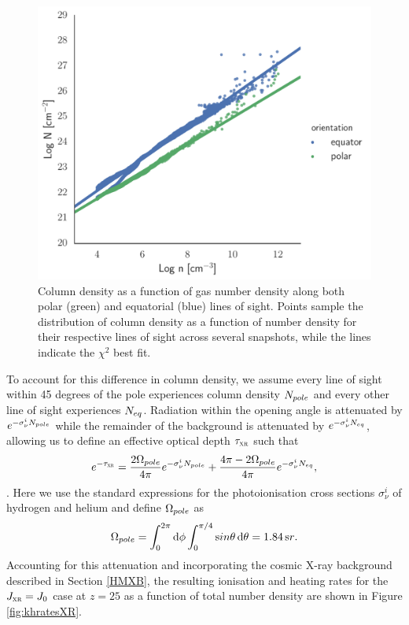 \documentclass[../thesis.tex]{subfiles}
\begin{document}
\begin{figure}
\begin{center}
\includegraphics[width=\columnwidth]{figures/optical_depth/col_density_fit}
\caption{\label{fig:ncol_fit}
Column density as a function of gas number density along both polar (green) and equatorial (blue) lines of sight.  Points sample the distribution of column density as a function of number density for their respective lines of sight across several snapshots, while the lines indicate the $\chi^2$ best fit.}
\end{center}
\end{figure}

To account for this difference in column density, we assume every line of sight within 45 degrees of the pole \citep{Hosokawaetal2011} experiences column density $N_{\mathrm \small pole}$ and every other line of sight experiences $N_{\mathrm \small eq}$. Radiation within the opening angle is attenuated by $e^{-\sigma_{\nu}^i N_{\mathrm \small pole}}$ while the remainder of the background is attenuated by $e^{-\sigma_{\nu}^i N_{\mathrm \small eq}}$, allowing us to define an effective optical depth $\tau_{\textsc{xr}}$ such that
\begin{equation}
e^{-\tau_{\textsc{xr}}} = \frac{2 \Omega_{\mathrm \small pole}}{4\pi} e^{-\sigma_{\nu}^i N_{\mathrm \small pole}} + \frac{4\pi - 2 \Omega_{\mathrm \small pole}}{4\pi} e^{-\sigma_{\nu}^i N_{\mathrm \small eq}},
\end{equation}
\citep[e.g.,][]{ClarkGlover2014}.
Here we use the standard expressions for the photoionisation cross sections $\sigma^i_{\nu}$ of hydrogen and helium \citep[e.g.,][]{BarkanaLoeb2001, OsterbrockFerland2006} and define $\Omega_{\mathrm \small pole}$ as
\begin{equation}
\Omega_{\mathrm \small pole} = \int_0^{2\pi}{\mathrm d}\phi \int_0^{\pi/4}{\mathrm sin}\theta \,{\mathrm d}\theta
                         = 1.84\,{\mathrm sr}.
\end{equation}
Accounting for this attenuation and incorporating the cosmic X-ray background described in Section \ref{HMXB}, the resulting ionisation and heating rates for the $J_{\textsc{xr}}=J_0$ case at $z=25$ as a function of total number density are shown in Figure \ref{fig:khratesXR}.
\end{document}
